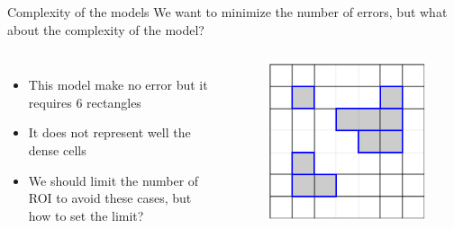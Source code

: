 \documentclass[10pt]{beamer}
\begin{document}
\begin{frame}{Complexity of the models}
    We want to minimize the number of errors, but what about the complexity of the model?

    \begin{columns}[T, onlytextwidth]

        \begin{itemize}
            \item This model make no error but it requires $6$ rectangles
            \item It does not represent well the dense cells
            \item We should limit the number of ROI to avoid these cases, but how to set the limit?
        \end{itemize}


        \begin{figure}
            \centering
            \includegraphics[scale=0.5]{figures/running-example/MDL/example-model-complex.pdf}
        \end{figure}
    \end{columns}
\end{frame}
\end{document}
